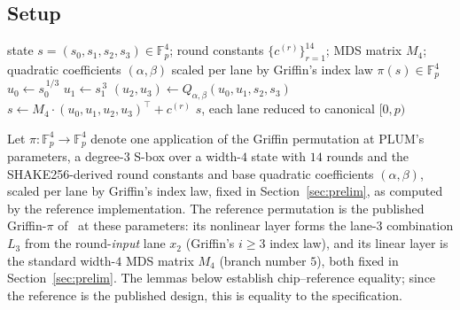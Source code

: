 \subsection{Setup}\label{app:air-setup}
\begin{algorithm}[H]
\caption{Reference Griffin-$\pi$ permutation over $\mathbb{F}_p^4$ at the
  deployed parameters}
\label{alg:griffin-pi}
\begin{algorithmic}[1]
\Require state $s=(s_0,s_1,s_2,s_3)\in\mathbb{F}_p^4$;
         round constants $\{c^{(r)}\}_{r=1}^{14}$;
         MDS matrix $M_4$; quadratic coefficients $(\alpha,\beta)$
         scaled per lane by Griffin's index law
\Ensure  $\pi(s)\in\mathbb{F}_p^4$
  \State $u_0 \gets s_0^{\,1/3}$
  \State $u_1 \gets s_1^{\,3}$
  \State $(u_2, u_3) \gets Q_{\alpha,\beta}(u_0, u_1, s_2, s_3)$
  \State $s \gets M_4 \cdot (u_0, u_1, u_2, u_3)^{\top} + c^{(r)}$
\EndFor
\State \Return $s$, each lane reduced to canonical $[0,p)$
\end{algorithmic}
\end{algorithm}

\begin{definition}\label{def:ref-perm}
Let $\pi\colon\mathbb{F}_p^{4}\to\mathbb{F}_p^{4}$ denote one application of the Griffin permutation at PLUM's parameters, a degree-$3$ S-box over a width-$4$ state with $14$ rounds and the SHAKE256-derived round constants and base quadratic coefficients $(\alpha,\beta)$, scaled per lane by Griffin's index law, fixed in Section~\ref{sec:prelim}, as computed by the reference implementation. The reference permutation is the published Griffin-$\pi$ of~\cite{cryptoeprint:2022/403} at these parameters: its nonlinear layer forms the lane-$3$ combination $L_3$ from the round-\emph{input} lane $x_2$ (Griffin's $i\ge 3$ index law), and its linear layer is the standard width-$4$ MDS matrix $M_4$ (branch number $5$), both fixed in Section~\ref{sec:prelim}. The lemmas below establish chip--reference equality; since the reference is the published design, this is equality to the specification.
\end{definition}

